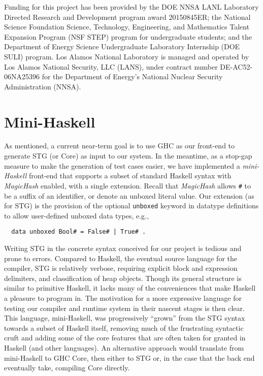 \documentclass{llncs}
\begin{document}
Funding for this project has been provided by the DOE NNSA LANL Laboratory
Directed Research and Development program award 20150845ER; the National
Science Foundation Science, Technology, Engineering, and Mathematics Talent
Expansion Program (NSF STEP) program for undergraduate students; and the Department of Energy
Science Undergraduate Laboratory Internship (DOE SULI) program.
%
Los Alamos National Laboratory is managed and operated by Los Alamos National
Security, LLC (LANS), under contract number DE-AC52-06NA25396 for the
Department of Energy's National Nuclear Security Administration (NNSA).


%
%

\appendix

\section{Mini-Haskell}

As mentioned, a current near-term goal is to use GHC as our front-end to
generate STG (or Core) as input to our system.  In the meantime, as a stop-gap
measure to make the generation of test cases easier, we have implemented a
\emph{mini-Haskell} front-end that supports a subset of standard Haskell
syntax with \emph{MagicHash} enabled, with a single extension.  Recall that
\emph{MagicHash} allows \texttt{\#} to be a suffix of an identifier, or denote
an unboxed literal value.  Our extension (as for STG) is the provision of
the optional \texttt{unboxed} keyword in datatype definitions to allow
user-defined unboxed data types, e.g.,
\begin{verbatim}
  data unboxed Bool# = False# | True# .
\end{verbatim}

Writing STG in the concrete syntax conceived for our project is tedious and
prone to errors.  Compared to Haskell, the eventual source language for the
compiler, STG is relatively verbose, requiring explicit block and expression
delimiters, and classification of heap objects. Though its general structure
is similar to primitive Haskell, it lacks many of the conveniences that make
Haskell a pleasure to program in.  The motivation for a more expressive
language for testing our compiler and runtime system in their nascent stages
is then clear.  This language, mini-Haskell, was progressively ``grown'' from
the STG syntax towards a subset of Haskell itself, removing much of the
frustrating syntactic cruft and adding some of the core features that are
often taken for granted in Haskell (and other languages).  An alternative
approach would translate from mini-Haskell to GHC Core, then either to STG or,
in the case that the back end eventually take, compiling Core directly.
\end{document}

